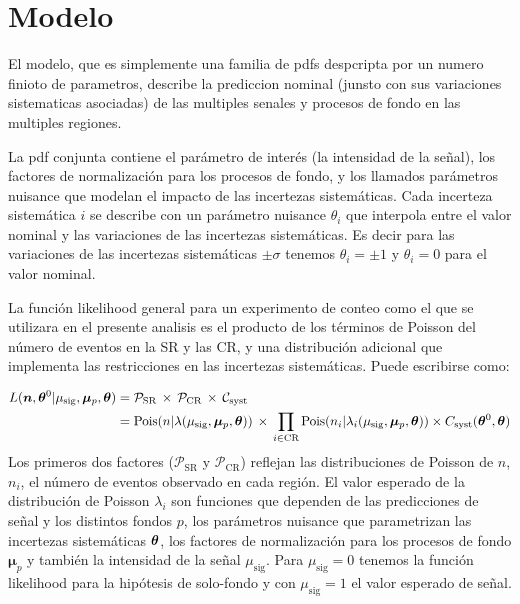 \section{Modelo}

El modelo, que es simplemente una familia de pdfs despcripta por un numero finioto
de parametros, describe la prediccion nominal (junsto con sus variaciones sistematicas
asociadas) de las multiples senales y procesos de fondo en las multiples regiones.

La pdf conjunta contiene el parámetro de interés (la intensidad
de la señal), los factores de normalización para los procesos de fondo, y los
llamados parámetros nuisance que modelan el impacto de las incertezas
sistemáticas. Cada incerteza sistemática $i$ se describe con un parámetro
nuisance $\theta_i$ que interpola entre el valor nominal y las variaciones de
las incertezas sistemáticas. Es decir para las variaciones de las incertezas
sistemáticas $\pm \sigma$ tenemos $\theta_i = \pm 1$ y $\theta_i = 0$ para el
valor nominal.

La función likelihood general para un experimento de conteo como el que se utilizara
en el presente analisis es el producto de los términos de Poisson del
número de eventos en la SR y las CR, y una distribución adicional que implementa
las restricciones en las incertezas sistemáticas. Puede escribirse como:

\begin{align}
  L(\bm{n}, \bm{\theta}^0| \mu_\text{sig}, \bm{\mu}_p, \bm{\theta}) &= \mathcal{P}_\text{SR} \, \times \, \mathcal{P}_\text{CR} \, \times \,
  \mathcal{C}_\text{syst} \nonumber \\
  &= \operatorname{Pois}(n|\lambda(\mu_\text{sig}, \bm{\mu}_p, \bm{\theta})) \, \times \, \prod_{i \in \text{CR}}
  \operatorname{Pois}(n_i|\lambda_i(\mu_\text{sig}, \bm{\mu}_p, \bm{\theta})) \times C_\text{syst} (\bm{\theta}^0, \bm{\theta})
\end{align}
%
Los primeros dos factores ($\mathcal{P}_\text{SR}$ y $\mathcal{P}_\text{CR}$)
reflejan las distribuciones de Poisson de $n$, $n_i$, el número de eventos observado
en cada región. El valor esperado de la distribución de Poisson $\lambda_i$ son
funciones que dependen de las predicciones de señal y los distintos fondos $p$,
los parámetros nuisance que parametrizan las incertezas sistemáticas $\bm{\theta}$,
los factores de normalización para los procesos de fondo $\bm{\mu}_p$ y también
la intensidad de la señal $\mu_\text{sig}$. Para $\mu_\text{sig} = 0$ tenemos la
función likelihood para la hipótesis de solo-fondo y con $\mu_\text{sig} = 1$ el
valor esperado de señal. %

